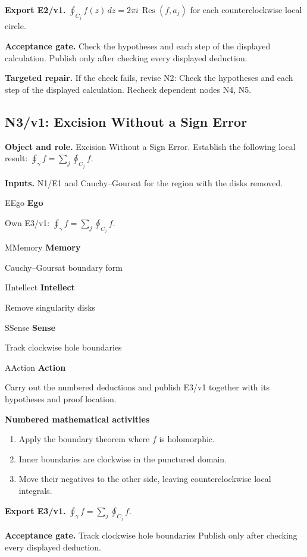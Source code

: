 \documentclass[preprint,12pt,aps,pra,showkeys,amsmath,amssymb,superscriptaddress,floatfix]{revtex4-2}
\theoremstyle{definition}
\theoremstyle{remark}
\newcommand{\mmfaculty}[3]{%
 \begin{mmfacultybox}{#1}{#2}
 {\sffamily\bfseries\color{MMBlue}#2}\par\smallskip #3
 \end{mmfacultybox}}
\newcommand{\field}[2]{\par\smallskip\noindent\textbf{#1.} #2\par}
\begin{document}
\field{Export E2/v1}{\(\oint_{C_j}f(z)\,dz=2\pi i\,\operatorname{Res}(f,a_j)\) for each
counterclockwise local circle.}

\field{Acceptance gate}{Check the hypotheses and each step of the displayed calculation. Publish
only after checking every displayed deduction.}

\field{Targeted repair}{If the check fails, revise N2: Check the hypotheses and each step of the
displayed calculation. Recheck dependent nodes N4, N5.}

\clearpage

\subsection{N3/v1: Excision Without a Sign Error}

\field{Object and role}{Excision Without a Sign Error. Establish the following local result:
\(\oint_\gamma f=\sum_j\oint_{C_j}f\).}

\field{Inputs}{N1/E1 and Cauchy--Goursat for the region with the disks removed.}

\mmfaculty{E}{Ego}{Own E3/v1: \(\oint_\gamma f=\sum_j\oint_{C_j}f\).}

\mmfaculty{M}{Memory}{Cauchy--Goursat boundary form}

\mmfaculty{I}{Intellect}{Remove singularity disks}

\mmfaculty{S}{Sense}{Track clockwise hole boundaries}

\mmfaculty{A}{Action}{Carry out the numbered deductions and publish E3/v1 together with its
hypotheses and proof location.}

\smallskip\noindent\textbf{Numbered mathematical activities}

\begin{enumerate}[label=N3.\arabic*,leftmargin=3.4em]

\item Apply the boundary theorem where \(f\) is holomorphic.

\item Inner boundaries are clockwise in the punctured domain.

\item Move their negatives to the other side, leaving counterclockwise local
integrals.

\end{enumerate}

\field{Export E3/v1}{\(\oint_\gamma f=\sum_j\oint_{C_j}f\).}

\field{Acceptance gate}{Track clockwise hole boundaries Publish only after checking every
displayed deduction.}
\end{document}
